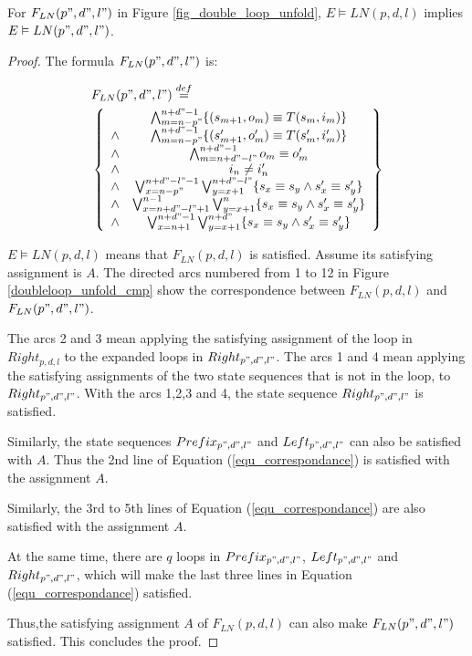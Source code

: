 \documentclass[journal]{IEEEtran}
\begin{document}
\begin{lemma}[]\label{lemma_unfold_longer}
For $F_{LN}(p",d",l")$ in Figure \ref{fig_double_loop_unfold},
$E\vDash LN(p,d,l)$ implies $E\vDash LN(p",d",l")$.
\end{lemma}
\begin{proof}
The formula $F_{LN}(p",d",l")$ is:

\begin{equation}\label{equ_correspondance}
\begin{split}
&F_{LN}(p",d",l")\stackrel{def}{=}\\
&\left\{
\begin{array}{cc}
&\bigwedge_{m=n-p"}^{n+d"-1}
\{
(s_{m+1},o_m)\equiv T(s_m,i_m)
\}
\\
\wedge&\bigwedge_{m=n-p"}^{n+d"-1}
\{
(s'_{m+1},o'_m)\equiv T(s'_m,i'_m)
\}
\\
\wedge&\bigwedge_{m=n+d"-l"}^{n+d"-1}o_m\equiv o'_m \\
\wedge& i_n\ne i'_n \\
\wedge& \bigvee_{x=n-p"}^{n+d"-l"-1}\bigvee_{y=x+1}^{n+d"-l"} \{s_x\equiv s_y\wedge s'_x\equiv s'_y\} \\
\wedge& \bigvee_{x=n+d"-l"+1}^{n-1}\bigvee_{y=x+1}^{n} \{s_x\equiv s_y\wedge s'_x\equiv s'_y\} \\
\wedge& \bigvee_{x=n+1}^{n+d"-1}\bigvee_{y=x+1}^{n+d"} \{s_x\equiv s_y\wedge s'_x\equiv s'_y\}
\end{array}
\right\}
\end{split}
\end{equation}

$E\vDash LN(p,d,l)$ means that $F_{LN}(p,d,l)$ is satisfied.
Assume its satisfying assignment is $A$.
The directed arcs numbered from 1 to 12 in Figure \ref{doubleloop_unfold_cmp}
show the correspondence between $F_{LN}(p,d,l)$ and $F_{LN}(p",d",l")$.

The arcs 2 and 3 mean applying the satisfying assignment of the loop in $Right_{p,d,l}$
to the expanded loops in $Right_{p",d",l"}$.
The arcs 1 and 4 mean applying the satisfying assignments of the two state sequences that is not in the loop,
to $Right_{p",d",l"}$.
With the arcs 1,2,3 and 4,
the state sequence $Right_{p",d",l"}$ is satisfied.

Similarly,
the state sequences $Prefix_{p",d",l"}$ and $Left_{p",d",l"}$ can also be satisfied with $A$.
Thus the 2nd line of Equation (\ref{equ_correspondance}) is satisfied with the assignment $A$.

Similarly,
the 3rd to 5th lines of Equation (\ref{equ_correspondance}) are also satisfied with the assignment $A$.

At the same time,
there are $q$ loops in $Prefix_{p",d",l"}$, $Left_{p",d",l"}$ and $Right_{p",d",l"}$,
which will make the last three lines in Equation (\ref{equ_correspondance}) satisfied.

Thus,the satisfying assignment $A$ of $F_{LN}(p,d,l)$ can also make $F_{LN}(p",d",l")$ satisfied.
This concludes the proof.
\end{proof}
\end{document}
